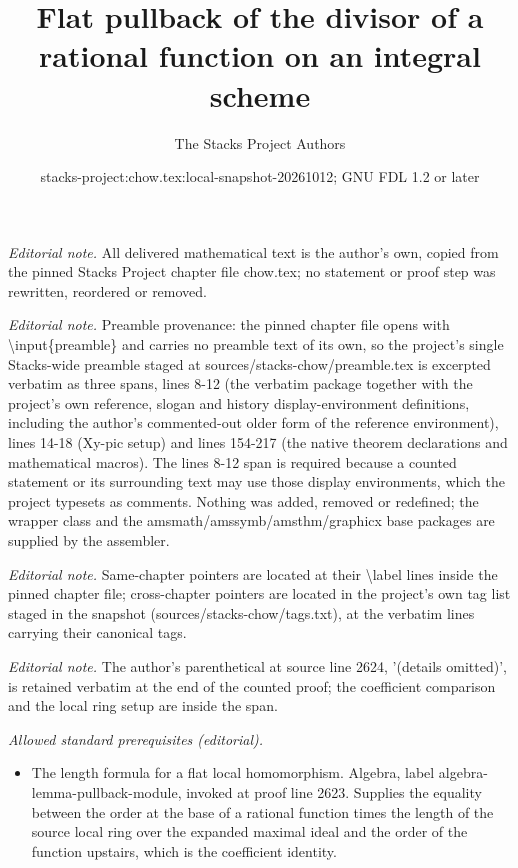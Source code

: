 \documentclass[10pt,a4paper]{amsart}
\title{Flat pullback of the divisor of a rational function on an integral scheme}
\author{The Stacks Project Authors}
\date{stacks-project:chow.tex:local-snapshot-20261012; GNU FDL 1.2 or later}
\theoremstyle{plain}
\theoremstyle{definition}
\theoremstyle{remark}
\numberwithin{equation}{subsection}
\begin{document}
\maketitle
\noindent\textit{Editorial note.} All delivered mathematical text is the author's own, copied from the pinned Stacks Project chapter file chow.tex; no statement or proof step was rewritten, reordered or removed.\par\medskip
\noindent\textit{Editorial note.} Preamble provenance: the pinned chapter file opens with \textbackslash{}input\{preamble\} and carries no preamble text of its own, so the project's single Stacks-wide preamble staged at sources/stacks-chow/preamble.tex is excerpted verbatim as three spans, lines 8-12 (the verbatim package together with the project's own reference, slogan and history display-environment definitions, including the author's commented-out older form of the reference environment), lines 14-18 (Xy-pic setup) and lines 154-217 (the native theorem declarations and mathematical macros). The lines 8-12 span is required because a counted statement or its surrounding text may use those display environments, which the project typesets as comments. Nothing was added, removed or redefined; the wrapper class and the amsmath/amssymb/amsthm/graphicx base packages are supplied by the assembler.\par\medskip
\noindent\textit{Editorial note.} Same-chapter pointers are located at their \textbackslash{}label lines inside the pinned chapter file; cross-chapter pointers are located in the project's own tag list staged in the snapshot (sources/stacks-chow/tags.txt), at the verbatim lines carrying their canonical tags.\par\medskip
\noindent\textit{Editorial note.} The author's parenthetical at source line 2624, '(details omitted)', is retained verbatim at the end of the counted proof; the coefficient comparison and the local ring setup are inside the span.\par\medskip
\noindent\textit{Allowed standard prerequisites (editorial).}\begin{itemize}
\item The length formula for a flat local homomorphism. Algebra, label algebra-lemma-pullback-module, invoked at proof line 2623. Supplies the equality between the order at the base of a rational function times the length of the source local ring over the expanded maximal ideal and the order of the function upstairs, which is the coefficient identity.
\end{itemize}\medskip
\end{document}

